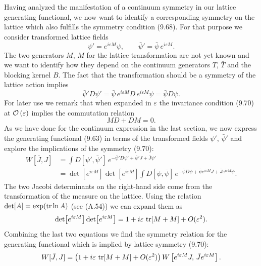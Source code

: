 Having analyzed the manifestation of a continuum symmetry in our lattice
generating functional, we now want to identify a corresponding symmetry on the
lattice which also fulfills the symmetry condition (9.68). For that purpose we
consider transformed lattice fields
\begin{equation}
  \psi' = e^{i\varepsilon M}\psi , \qquad
  \bar\psi' = \bar\psi\,e^{i\varepsilon M} .
\end{equation}
The two generators $M$, $M$ for the lattice transformation are not yet known
and we want to identify how they depend on the continuum generators $T$,
$\bar T$ and the blocking kernel $B$. The fact that the transformation should
be a symmetry of the lattice action implies
\begin{equation}
  \bar\psi' D\psi' = \bar\psi\,e^{i\varepsilon M}D\,e^{i\varepsilon M}\psi = \bar\psi D\psi .
\end{equation}
For later use we remark that when expanded in $\varepsilon$ the invariance
condition (9.70) at $\mathcal{O}\left(\varepsilon\right)$ implies the commutation relation
\begin{equation}
  M D + D M = 0 .
\end{equation}
As we have done for the continuum expression in the last section, we now
express the generating functional (9.63) in terms of the transformed fields
$\psi'$, $\bar\psi'$ and explore the implications of the symmetry (9.70):
\begin{align}
  W[\bar J,J] &= \int D[\psi',\bar\psi']\,e^{-\bar\psi' D\psi' + \bar\psi' J + \bar J\psi'} \nonumber\\
  &= \det\!\left[e^{i\varepsilon M}\right]\det\!\left[e^{i\varepsilon M}\right]
     \int D[\psi,\bar\psi]\,
     e^{-\bar\psi D\psi + \bar\psi e^{i\varepsilon M}J + \bar J e^{i\varepsilon M}\psi} .
\end{align}
The two Jacobi determinants on the right-hand side come from the
transformation of the measure on the lattice. Using the relation $\det[A] =
\exp(\operatorname{tr}\ln A)$ (see (A.54)) we can expand them as
\begin{equation}
  \det\!\left[e^{i\varepsilon M}\right]\det\!\left[e^{i\varepsilon M}\right]
  = 1 + i\varepsilon\,\operatorname{tr}[M + M] + O(\varepsilon^2) .
\end{equation}
Combining the last two equations we find the symmetry relation for the
generating functional which is implied by lattice symmetry (9.70):
\begin{equation}
  W[\bar J,J] = \left(1 + i\varepsilon\,\operatorname{tr}[M + M] + O(\varepsilon^2)\right)
    W\left[e^{i\varepsilon M}J,\,\bar J e^{i\varepsilon M}\right] .
\end{equation}
